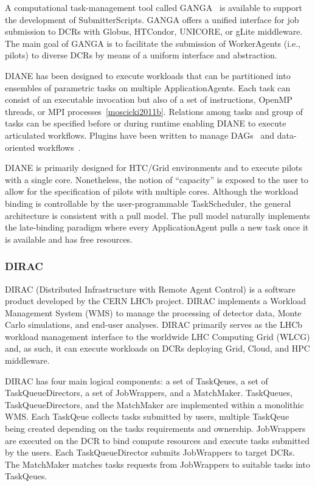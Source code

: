 \documentclass{sig-alternate}
\begin{document}
A computational task-management tool called
GANGA~\cite{moscicki2009ganga,ganga_url} is available to support the development
of SubmitterScripts. GANGA offers a unified interface for job submission to DCRs
with Globus, HTCondor, UNICORE, or gLite middleware. The main goal of GANGA is
to facilitate the submission of WorkerAgents (i.e., pilots) to diverse DCRs by
means of a uniform interface and abstraction.

DIANE has been designed to execute workloads that can be partitioned into
ensembles of parametric tasks on multiple ApplicationAgents. Each task can
consist of an executable invocation but also of a set of instructions, OpenMP
threads, or MPI processes~\ref{moscicki2011b}. Relations among tasks and group
of tasks can be specified before or during runtime enabling DIANE to execute
articulated workflows. Plugins have been written to manage
DAGs~\cite{grzeslo2009} and data-oriented workflows~\cite{glatard2008}.

DIANE is primarily designed for HTC/Grid environments and to execute pilots with
a single core. Nonetheless, the notion of ``capacity'' is exposed to the user to
allow for the specification of pilots with multiple cores. Although the workload
binding is controllable by the user-programmable TaskScheduler, the general
architecture is consistent with a pull model. The pull model naturally
implements the late-binding paradigm where every ApplicationAgent pulls a new
task once it is available and has free resources.

%
\subsubsection{DIRAC}\label{sec:dirac}

DIRAC (Distributed Infrastructure with Remote Agent Control) is a software
product developed by the CERN LHCb project\cite{diracgrid2004}. DIRAC implements
a Workload Management System (WMS) to manage the processing of detector data,
Monte Carlo simulations, and end-user analyses. DIRAC primarily serves as the
LHCb workload management interface to the worldwide LHC Computing Grid (WLCG)
and, as such, it can execute workloads on DCRs deploying Grid, Cloud, and HPC
middleware.

DIRAC has four main logical components: a set of TaskQeues, a set of
TaskQueueDirectors, a set of JobWrappers, and a MatchMaker. TaskQueues,
TaskQueueDirectors, and the MatchMaker are implemented within a monolithic WMS.
Each TaskQeue collects tasks submitted by users, multiple TaskQeue being created
depending on the tasks requirements and ownership. JobWrappers are executed on
the DCR to bind compute resources and execute tasks submitted by the users. Each
TaskQueueDirector submits JobWrappers to target DCRs. The MatchMaker matches
tasks requests from JobWrappers to suitable tasks into TaskQeues.
\end{document}
